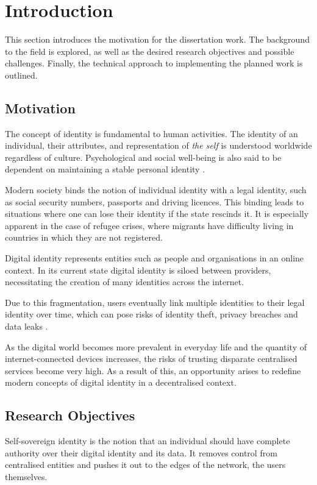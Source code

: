 \chapter{Introduction}
This section introduces the motivation for the dissertation work. The background to the field is explored, as well as the desired research objectives and possible challenges. Finally, the technical approach to implementing the planned work is outlined.

\section{Motivation}
\label{sec:motivation}
The concept of identity is fundamental to human activities. The identity of an individual, their attributes, and representation of \textit{the self} is understood worldwide regardless of culture. Psychological and social well-being is also said to be dependent on maintaining a stable personal identity \cite{sharma_self_2010}. 

Modern society binds the notion of individual identity with a legal identity, such as social security numbers, passports and driving licences. This binding leads to situations where one can lose their identity if the state rescinds it. It is especially apparent in the case of refugee crises, where migrants have difficulty living in countries in which they are not registered.

Digital identity represents entities such as people and organisations in an online context. In its current state digital identity is siloed between providers, necessitating the creation of many identities across the internet.

Due to this fragmentation, users eventually link multiple identities to their legal identity over time, which can pose risks of identity theft, privacy breaches and data leaks \cite{camp_economics_2012}.

As the digital world becomes more prevalent in everyday life and the quantity of internet-connected devices increases, the risks of trusting disparate centralised services become very high. As a result of this, an opportunity arises to redefine modern concepts of digital identity in a decentralised context.

\section{Research Objectives}
Self-sovereign identity is the notion that an individual should have complete authority over their digital identity and its data. It removes control from centralised entities and pushes it out to the edges of the network, the users themselves.

